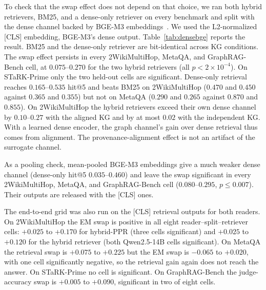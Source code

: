 \documentclass[11pt]{article}
\begin{document}
To check that the swap effect does not depend on that choice, we ran both hybrid retrievers, BM25, and a dense-only retriever on every benchmark and split with the dense channel backed by BGE-M3 embeddings~\citep{chen2024bgem3}. We used the L2-normalized [CLS] embedding, BGE-M3's dense output. Table~\ref{tab:densebge} reports the result. BM25 and the dense-only retriever are bit-identical across KG conditions. The swap effect persists in every 2WikiMultiHop, MetaQA, and GraphRAG-Bench cell, at $0.075$--$0.270$ for the two hybrid retrievers (all $p<2\times10^{-4}$). On STaRK-Prime only the two held-out cells are significant. Dense-only retrieval reaches $0.165$--$0.535$ hit@5 and beats BM25 on 2WikiMultiHop ($0.470$ and $0.450$ against $0.365$ and $0.355$) but not on MetaQA ($0.290$ and $0.265$ against $0.870$ and $0.855$). On 2WikiMultiHop the hybrid retrievers exceed their own dense channel by $0.10$--$0.27$ with the aligned KG and by at most $0.02$ with the independent KG. With a learned dense encoder, the graph channel's gain over dense retrieval thus comes from alignment. The provenance-alignment effect is not an artifact of the surrogate channel.

As a pooling check, mean-pooled BGE-M3 embeddings give a much weaker dense channel (dense-only hit@5 $0.035$--$0.460$) and leave the swap significant in every 2WikiMultiHop, MetaQA, and GraphRAG-Bench cell ($0.080$--$0.295$, $p\leq0.007$). Their outputs are released with the [CLS] ones.

The end-to-end grid was also run on the [CLS] retrieval outputs for both readers. On 2WikiMultiHop the EM swap is positive in all eight reader--split--retriever cells: $+0.025$ to $+0.170$ for hybrid-PPR (three cells significant) and $+0.025$ to $+0.120$ for the hybrid retriever (both Qwen2.5-14B cells significant). On MetaQA the retrieval swap is $+0.075$ to $+0.225$ but the EM swap is $-0.065$ to $+0.020$, with one cell significantly negative, so the retrieval gain again does not reach the answer. On STaRK-Prime no cell is significant. On GraphRAG-Bench the judge-accuracy swap is $+0.005$ to $+0.090$, significant in two of eight cells.
\end{document}
